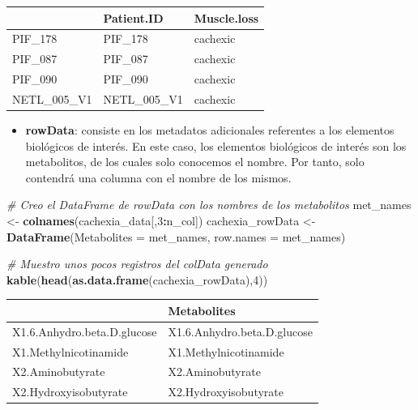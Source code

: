 \documentclass[
]{article}
\newenvironment{Shaded}{\begin{snugshade}}{\end{snugshade}}
\newcommand{\AttributeTok}[1]{\textcolor[rgb]{0.13,0.29,0.53}{#1}}
\newcommand{\CommentTok}[1]{\textcolor[rgb]{0.56,0.35,0.01}{\textit{#1}}}
\newcommand{\DecValTok}[1]{\textcolor[rgb]{0.00,0.00,0.81}{#1}}
\newcommand{\FunctionTok}[1]{\textcolor[rgb]{0.13,0.29,0.53}{\textbf{#1}}}
\newcommand{\NormalTok}[1]{#1}
\newcommand{\OtherTok}[1]{\textcolor[rgb]{0.56,0.35,0.01}{#1}}
\newcommand{\SpecialCharTok}[1]{\textcolor[rgb]{0.81,0.36,0.00}{\textbf{#1}}}
\providecommand{\tightlist}{%
  \setlength{\itemsep}{0pt}\setlength{\parskip}{0pt}}
\begin{document}
\begin{longtable}[]{@{}lll@{}}
\toprule\noalign{}
& Patient.ID & Muscle.loss \\
\midrule\noalign{}
\endhead
\bottomrule\noalign{}
\endlastfoot
PIF\_178 & PIF\_178 & cachexic \\
PIF\_087 & PIF\_087 & cachexic \\
PIF\_090 & PIF\_090 & cachexic \\
NETL\_005\_V1 & NETL\_005\_V1 & cachexic \\
\end{longtable}

\begin{itemize}
\tightlist
\item
  \textbf{rowData}: consiste en los metadatos adicionales referentes a
  los elementos biológicos de interés. En este caso, los elementos
  biológicos de interés son los metabolitos, de los cuales solo
  conocemos el nombre. Por tanto, solo contendrá una columna con el
  nombre de los mismos.
\end{itemize}

\begin{Shaded}
\begin{Highlighting}[]
\CommentTok{\# Creo el DataFrame de rowData con los nombres de los metabolitos}
\NormalTok{met\_names }\OtherTok{\textless{}{-}} \FunctionTok{colnames}\NormalTok{(cachexia\_data[,}\DecValTok{3}\SpecialCharTok{:}\NormalTok{n\_col])}
\NormalTok{cachexia\_rowData }\OtherTok{\textless{}{-}} \FunctionTok{DataFrame}\NormalTok{(}\AttributeTok{Metabolites =}\NormalTok{ met\_names, }\AttributeTok{row.names =}\NormalTok{ met\_names)}

\CommentTok{\# Muestro unos pocos registros del colData generado}
\FunctionTok{kable}\NormalTok{(}\FunctionTok{head}\NormalTok{(}\FunctionTok{as.data.frame}\NormalTok{(cachexia\_rowData),}\DecValTok{4}\NormalTok{))}
\end{Highlighting}
\end{Shaded}

\begin{longtable}[]{@{}ll@{}}
\toprule\noalign{}
& Metabolites \\
\midrule\noalign{}
\endhead
\bottomrule\noalign{}
\endlastfoot
X1.6.Anhydro.beta.D.glucose & X1.6.Anhydro.beta.D.glucose \\
X1.Methylnicotinamide & X1.Methylnicotinamide \\
X2.Aminobutyrate & X2.Aminobutyrate \\
X2.Hydroxyisobutyrate & X2.Hydroxyisobutyrate \\
\end{longtable}
\end{document}
